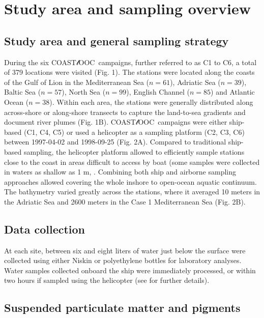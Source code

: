 \documentclass[essd, manuscript]{copernicus}
\newcommand{\coastlooc}{COAST$\mathscr{l}$OOC~\allowbreak}
\begin{document}
\section{Study area and sampling overview}

\subsection{Study area and general sampling strategy}

During the six \coastlooc campaigns, further referred to as C1 to C6, a total of 379 locations were visited (Fig. 1). The stations were located along the coasts of the Gulf of Lion in the Mediterranean Sea ($n = 61$), Adriatic Sea ($n = 39$), Baltic Sea ($n = 57$), North Sea ($n = 99$), English Channel ($n = 85$) and Atlantic Ocean ($n = 38$). Within each area, the stations were generally distributed along across-shore or along-shore transects to capture the land-to-sea gradients and document river plumes (Fig. 1B). \coastlooc campaigns were either ship-based (C1, C4, C5) or used a helicopter as a sampling platform (C2, C3, C6) between 1997-04-02 and 1998-09-25 (Fig. 2A). Compared to traditional ship-based sampling, the helicopter platform allowed to efficiently sample stations close to the coast in areas difficult to access by boat (some samples were collected in waters as shallow as 1 m, \citealt{Babin2003b}. Combining both ship and airborne sampling approaches allowed covering the whole inshore to open-ocean aquatic continuum. The bathymetry \citep{GEBCO2020} varied greatly across the stations, where it averaged 10 meters in the Adriatic Sea and 2600 meters in the Case 1 Mediterranean Sea (Fig. 2B).

\subsection{Data collection}

At each site, between six and eight liters of water just below the surface were collected using either Niskin or polyethylene bottles for laboratory analyses. Water samples collected onboard the ship were immediately processed, or within two hours if sampled using the helicopter (see \citealt{Babin2003b} for further details).

\subsection{Suspended particulate matter and pigments}
\end{document}
